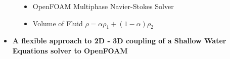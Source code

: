 \begin{frame}
\begin{figure}
\begin{minipage}{0.1\linewidth}
\end{minipage}
\begin{minipage}{0.15\linewidth}
\begin{tcolorbox}[title=\centering interFoam\\3D, colframe=TUMOrange,
colback=TUMOrange!30] 
\addtolength{\leftmargini}{-1.5em}
\begin{itemize}
\setlength{\itemsep}{5ex}
\vspace{0.5cm}
\item OpenFOAM Multiphase Navier-Stokes Solver
\item Volume of Fluid $\rho=\alpha\rho_1 + (1-\alpha)\rho_2$
\end{itemize}
\end{tcolorbox}
\end{minipage}
\end{figure}

\begin{minipage}{1\textwidth}
\begin{itemize}
\addtolength{\itemindent}{-1em} 
\item<2->[] \begin{tcolorbox}[colframe=TUMGreen,
colback=TUMGreen!30] 
\centering
\textbf{A flexible approach to 2D - 3D coupling of a Shallow Water Equations solver to OpenFOAM}
\end{tcolorbox}
\end{itemize}
\end{minipage}
\end{frame}




%

